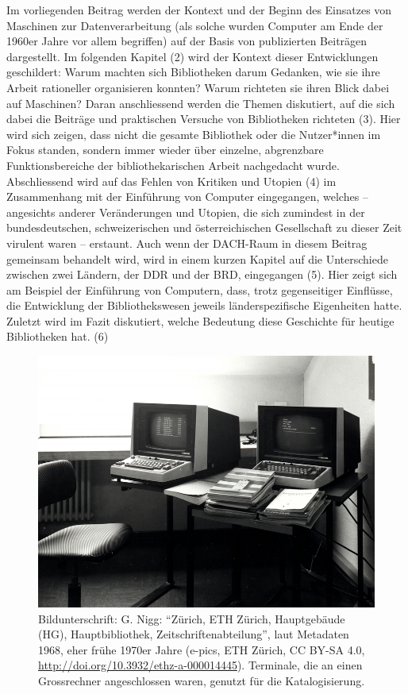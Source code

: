 \documentclass[a4paper,
fontsize=11pt,
oneside,
numbers=noperiodatend,
parskip=half-,
bibliography=totoc,
final
]{scrartcl}
\begin{document}
Im vorliegenden Beitrag werden der Kontext und der Beginn des Einsatzes
von Maschinen zur Datenverarbeitung (als solche wurden Computer am Ende
der 1960er Jahre vor allem begriffen) auf der Basis von publizierten
Beiträgen dargestellt. Im folgenden Kapitel (2) wird der Kontext dieser
Entwicklungen geschildert: Warum machten sich Bibliotheken darum
Gedanken, wie sie ihre Arbeit rationeller organisieren konnten? Warum
richteten sie ihren Blick dabei auf Maschinen? Daran anschliessend
werden die Themen diskutiert, auf die sich dabei die Beiträge und
praktischen Versuche von Bibliotheken richteten (3). Hier wird sich
zeigen, dass nicht die gesamte Bibliothek oder die Nutzer*innen im Fokus
standen, sondern immer wieder über einzelne, abgrenzbare
Funktionsbereiche der bibliothekarischen Arbeit nachgedacht wurde.
Abschliessend wird auf das Fehlen von Kritiken und Utopien (4) im
Zusammenhang mit der Einführung von Computer eingegangen, welches --
angesichts anderer Veränderungen und Utopien, die sich zumindest in der
bundesdeutschen, schweizerischen und österreichischen Gesellschaft zu
dieser Zeit virulent waren -- erstaunt. Auch wenn der DACH-Raum in
diesem Beitrag gemeinsam behandelt wird, wird in einem kurzen Kapitel
auf die Unterschiede zwischen zwei Ländern, der DDR und der BRD,
eingegangen (5). Hier zeigt sich am Beispiel der Einführung von
Computern, dass, trotz gegenseitiger Einflüsse, die Entwicklung der
Bibliothekswesen jeweils länderspezifische Eigenheiten hatte. Zuletzt
wird im Fazit diskutiert, welche Bedeutung diese Geschichte für heutige
Bibliotheken hat. (6)

\begin{figure}
\centering
\includegraphics[width=.7\textwidth]{img/ETHZuerich01.jpg}
\caption{Bildunterschrift: G. Nigg: \enquote{Zürich, ETH Zürich, Hauptgebäude
(HG), Hauptbibliothek, Zeitschriftenabteilung}, laut Metadaten 1968,
eher frühe 1970er Jahre (e-pics, ETH Zürich, CC BY-SA 4.0,
\url{http://doi.org/10.3932/ethz-a-000014445}). Terminale, die an einen
Grossrechner angeschlossen waren, genutzt für die Katalogisierung.}
\end{figure}
\end{document}
